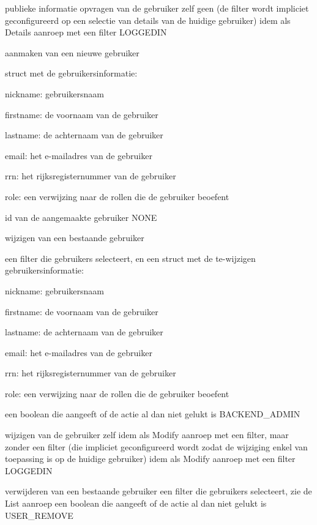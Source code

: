	{ publieke informatie opvragen van de gebruiker zelf }
	{ geen (de filter wordt impliciet geconfigureerd op een selectie van details van de huidige gebruiker) }
	{ idem als Details aanroep met een filter }
	{ LOGGEDIN }

	{ aanmaken van een nieuwe gebruiker }
	{ struct met de gebruikersinformatie:
		\begin{itemize_compact}
		\item{nickname: gebruikersnaam}
		\item{firstname: de voornaam van de gebruiker}
		\item{lastname: de achternaam van de gebruiker}
		\item{email: het e-mailadres van de gebruiker}
		\item{rrn: het rijksregisternummer van de gebruiker}
		\item{role: een verwijzing naar de rollen die de gebruiker beoefent}
		\end{itemize_compact} }
	{ id van de aangemaakte gebruiker }
	{ NONE }

	{ wijzigen van een bestaande gebruiker }
	{ een filter die gebruikers selecteert, en een struct met de te-wijzigen gebruikersinformatie:
		\begin{itemize_compact}
			\item{nickname: gebruikersnaam}
			\item{firstname: de voornaam van de gebruiker}
			\item{lastname: de achternaam van de gebruiker}
			\item{email: het e-mailadres van de gebruiker}
			\item{rrn: het rijksregisternummer van de gebruiker}
			\item{role: een verwijzing naar de rollen die de gebruiker beoefent}
		\end{itemize_compact} }
	{ een boolean die aangeeft of de actie al dan niet gelukt is }
	{ BACKEND\_ADMIN }

	{ wijzigen van de gebruiker zelf }
	{ idem als Modify aanroep met een filter, maar zonder een filter (die impliciet geconfigureerd wordt zodat de wijziging enkel van toepassing is op de huidige gebruiker) }
	{ idem als Modify aanroep met een filter }
	{ LOGGEDIN }

	{ verwijderen van een bestaande gebruiker }
	{ een filter die gebruikers selecteert, zie de List aanroep }
	{ een boolean die aangeeft of de actie al dan niet gelukt is }
	{ USER\_REMOVE }
	
